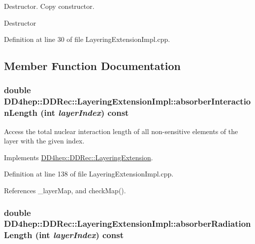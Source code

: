 Destructor. Copy constructor.

Destructor 

Definition at line 30 of file LayeringExtensionImpl.cpp.

\subsection{Member Function Documentation}
\hypertarget{class_d_d4hep_1_1_d_d_rec_1_1_layering_extension_impl_ac30e3e0b49ca4f79c5ccd173dcfc669e}{
\subsubsection[{absorberInteractionLength}]{\setlength{\rightskip}{0pt plus 5cm}double DD4hep::DDRec::LayeringExtensionImpl::absorberInteractionLength (int {\em layerIndex}) const}}
\label{class_d_d4hep_1_1_d_d_rec_1_1_layering_extension_impl_ac30e3e0b49ca4f79c5ccd173dcfc669e}


Access the total nuclear interaction length of all non-\/sensitive elements of the layer with the given index. 

Implements \hyperlink{class_d_d4hep_1_1_d_d_rec_1_1_layering_extension_af18b1293c0631bd55798e7c73eddeb6b}{DD4hep::DDRec::LayeringExtension}.

Definition at line 138 of file LayeringExtensionImpl.cpp.

References \_\-layerMap, and checkMap().\hypertarget{class_d_d4hep_1_1_d_d_rec_1_1_layering_extension_impl_ac2322db259f10e8e7ff13878c5273fb0}{
\subsubsection[{absorberRadiationLength}]{\setlength{\rightskip}{0pt plus 5cm}double DD4hep::DDRec::LayeringExtensionImpl::absorberRadiationLength (int {\em layerIndex}) const}}
\label{class_d_d4hep_1_1_d_d_rec_1_1_layering_extension_impl_ac2322db259f10e8e7ff13878c5273fb0}



